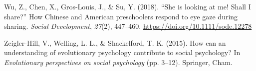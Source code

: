 \documentclass[
  man,floatsintext]{apa7}
\newlength{\cslhangindent}
\newenvironment{CSLReferences}[2] %
 {\begin{list}{}{%
  \setlength{\itemindent}{0pt}
  \setlength{\leftmargin}{0pt}
  \setlength{\parsep}{0pt}
  \ifodd #1
   \setlength{\leftmargin}{\cslhangindent}
   \setlength{\itemindent}{-1\cslhangindent}
  \fi
  \setlength{\itemsep}{#2\baselineskip}}}
 {\end{list}}
\begin{document}
\begin{CSLReferences}{1}{0}
Wu, Z., Chen, X., Gros-Louis, J., \& Su, Y. (2018). {``{She} is looking at me! {Shall I} share?''} {How Chinese} and {American} preschoolers respond to eye gaze during sharing. \emph{Social Development}, \emph{27}(2), 447--460. \url{https://doi.org/10.1111/sode.12278}

Zeigler-Hill, V., Welling, L. L., \& Shackelford, T. K. (2015). How can an understanding of evolutionary psychology contribute to social psychology? In \emph{Evolutionary perspectives on social psychology} (pp. 3--12). Springer, Cham.

\end{CSLReferences}

\endgroup
\end{document}
